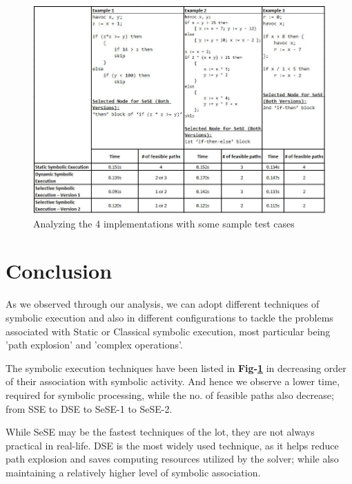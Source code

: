 \documentclass[11pt]{llncs}
\begin{document}
	\vspace{-4mm}

	\begin{figure}[H]
		\includegraphics[width=1.07\textwidth]{Analysis.JPG}
		\caption{Analyzing the 4 implementations with some sample test cases} \label{fig_7}
	\end{figure}

	\vspace{-5mm}

\section{Conclusion}
	As we observed through our analysis, we can adopt different techniques of symbolic execution and also in different configurations to tackle the problems associated with Static or Classical symbolic execution, most particular being 'path explosion' and 'complex operations'.

	\vspace{2mm}

	The symbolic execution techniques have been listed in \textbf{Fig-\ref{fig_7}} in decreasing order of their association with symbolic activity. And hence we observe a lower time, required for symbolic processing, while the no. of feasible paths also decrease; from SSE to DSE to SeSE-1 to SeSE-2.

	\vspace{2mm}

	While SeSE may be the fastest techniques of the lot, they are not always practical in real-life. DSE is the most widely used technique, as it helps reduce path explosion and saves computing resources utilized by the solver; while also maintaining a relatively higher level of symbolic association.
\end{document}
